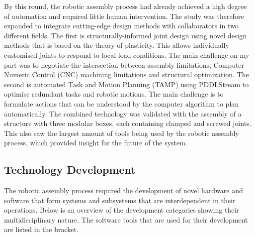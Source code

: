 \begin{description}[style=standard]
    \item [Exploration Round 5 - CantiBox Demonstrator] By this round, the robotic assembly process had already achieved a high degree of automation and required little human intervention. The study was therefore expanded to integrate cutting-edge design methods with collaborators in two different fields. The first is structurally-informed joint design using novel design methods that is based on the theory of plasticity. This allows individually customised joints to respond to local load conditions. The main challenge on my part was to negotiate the intersection between assembly limitations, Computer Numeric Control (CNC) machining limitations and structural optimization. The second is automated Task and Motion Planning (TAMP) using PDDLStream to optimise redundant tasks and robotic motions. The main challenge is to formulate actions that can be understood by the computer algorithm to plan automatically. The combined technology was validated with the assembly of a structure with three modular boxes, each containing clamped and screwed joints. This also saw the largest amount of tools being used by the robotic assembly process, which provided insight for the future of the system. 
 
\end{description}
\subsection{Technology Development}
\label{subsection:methodology-technology-development}

The robotic assembly process required the development of novel hardware and software that form systems and subsystems that are interdependent in their operations. Below is an overview of the development categories showing their multidisciplinary nature. The software tools that are used for their development are listed in the bracket. 

